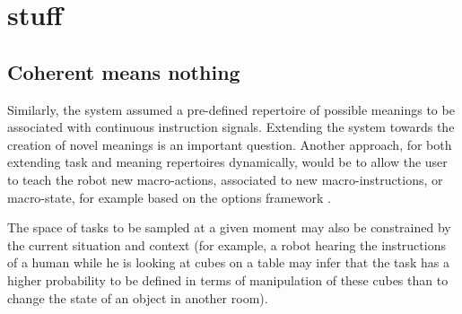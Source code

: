 \section{stuff}

\subsection{Coherent means nothing}

Similarly, the system assumed a pre-defined repertoire of possible meanings to be associated with continuous instruction signals. Extending the system towards the creation of novel meanings is an important question. Another approach, for both extending task and meaning repertoires dynamically, would be to allow the user to teach the robot new macro-actions, associated to new macro-instructions, or macro-state, for example based on the options framework \cite{sutton1999between}.

The space of tasks to be sampled at a given moment may also be constrained by the current situation and context (for example, a robot hearing the instructions of a human while he is looking at cubes on a table may infer that the task has a higher probability to be defined in terms of manipulation of these cubes than to change the state of an object in another room). 